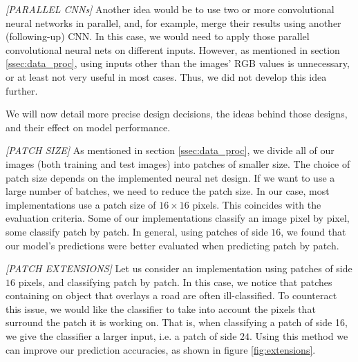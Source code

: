 \documentclass[10pt,conference,compsocconf]{IEEEtran}
\begin{document}
\textit{[PARALLEL CNNs]}  
Another idea would be to use two or more convolutional neural networks in parallel, and, for example, merge their results using another (following-up) CNN. In this case, we would need to apply those parallel convolutional neural nets on different inputs. However, as mentioned in section \ref{ssec:data_proc}, using inputs other than the images' RGB values is unnecessary, or at least not very useful in most cases. Thus, we did not develop this idea further.

We will now detail more precise design decisions, the ideas behind those designs, and their effect on model performance.

\textit{[PATCH SIZE]} 
As mentioned in section \ref{ssec:data_proc}, we divide all of our images (both training and test images) into patches of smaller size. The choice of patch size depends on the implemented neural net design. If we want to use a large number of batches, we need to reduce the patch size. In our case, most implementations use a patch size of $16 \times 16$ pixels. This coincides with the evaluation criteria. Some of our implementations classify an image pixel by pixel, some classify patch by patch. In general, using patches of side $16$, we found that our model's predictions were better evaluated when predicting patch by patch.

\textit{[PATCH EXTENSIONS]} 
Let us consider an implementation using patches of side $16$ pixels, and classifying patch by patch. In this case, we notice that patches containing on object that overlays a road are often ill-classified. To counteract this issue, we would like the classifier to take into account the pixels that surround the patch it is working on. That is, when classifying a patch of side 16, we give the classifier a larger input, i.e. a patch of side $24$. Using this method we can improve our prediction accuracies, as shown in figure \ref{fig:extensions}.
\end{document}
